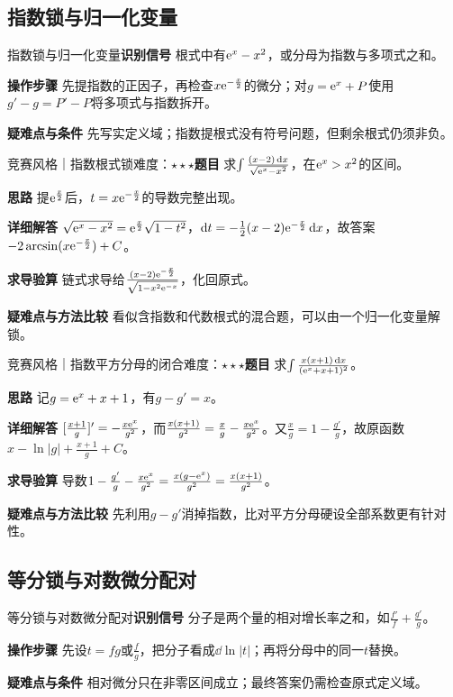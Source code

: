 \subsection{指数锁与归一化变量}\label{ic:indefinite_algebra_complete:explock}\begin{method}{指数锁与归一化变量}\textbf{识别信号} 根式中有$\mathrm{e}^x-x^2$，或分母为指数与多项式之和。\par \textbf{操作步骤} 先提指数的正因子，再检查$x\mathrm{e}^{-\frac{x}{2}}$的微分；对$g=\mathrm{e}^x+P$使用$g'-g=P'-P$将多项式与指数拆开。\par \textbf{疑难点与条件} 先写实定义域；指数提根式没有符号问题，但剩余根式仍须非负。\end{method}

\begin{example}{竞赛风格｜指数根式锁}{难度：$\star\star\star$}\label{ic:ex:indefinite_algebra_complete:exprootlock}\textbf{题目} 求$\int\frac{(x-2)\mathop{}\!\mathrm{d} x}{\sqrt{\mathrm{e}^x-x^2}}$，在$\mathrm{e}^x>x^2$的区间。\par \textbf{思路} 提$\mathrm{e}^{\frac{x}{2}}$后，$t=x\mathrm{e}^{-\frac{x}{2}}$的导数完整出现。\par \textbf{详细解答} $\sqrt{\mathrm{e}^x-x^2}=\mathrm{e}^{\frac{x}{2}}\sqrt{1-t^2}$，$\mathop{}\!\mathrm{d} t=-\frac12(x-2)\mathrm{e}^{-\frac{x}{2}}\mathop{}\!\mathrm{d} x$，故答案$-2\arcsin(x\mathrm{e}^{-\frac{x}{2}})+C$。\par \textbf{求导验算} 链式求导给$\frac{(x-2)\mathrm{e}^{-\frac{x}{2}}}{\sqrt{1-x^2\mathrm{e}^{-x}}}$，化回原式。\par \textbf{疑难点与方法比较} 看似含指数和代数根式的混合题，可以由一个归一化变量解锁。\end{example}

\begin{example}{竞赛风格｜指数平方分母的闭合}{难度：$\star\star\star$}\label{ic:ex:indefinite_algebra_complete:expsquarelock}\textbf{题目} 求$\int \frac{x(x+1)\mathop{}\!\mathrm{d} x}{(\mathrm{e}^x+x+1)^2}$。\par \textbf{思路} 记$g=\mathrm{e}^x+x+1$，有$g-g'=x$。\par \textbf{详细解答} $[\frac{x+1}{g}]'=-\frac{x\mathrm{e}^x}{g^2}$，而$\frac{x(x+1)}{g^2}=\frac{x}{g}-\frac{x\mathrm{e}^x}{g^2}$。又$\frac{x}{g}=1-\frac{g'}{g}$，故原函数$x-\ln|g|+\frac{x+1}{g}+C$。\par \textbf{求导验算} 导数$1-\frac{g'}{g}-\frac{x\mathrm{e}^x}{g^2}=\frac{x(g-\mathrm{e}^x)}{g^2}=\frac{x(x+1)}{g^2}$。\par \textbf{疑难点与方法比较} 先利用$g-g'$消掉指数，比对平方分母硬设全部系数更有针对性。\end{example}

\subsection{等分锁与对数微分配对}\label{ic:indefinite_algebra_complete:equalparts}\begin{method}{等分锁与对数微分配对}\textbf{识别信号} 分子是两个量的相对增长率之和，如$\frac{f'}{f}+\frac{g'}{g}$。\par \textbf{操作步骤} 先设$t=fg$或$\frac{f}{g}$，把分子看成$\dd\ln|t|$；再将分母中的同一$t$替换。\par \textbf{疑难点与条件} 相对微分只在非零区间成立；最终答案仍需检查原式定义域。\end{method}

